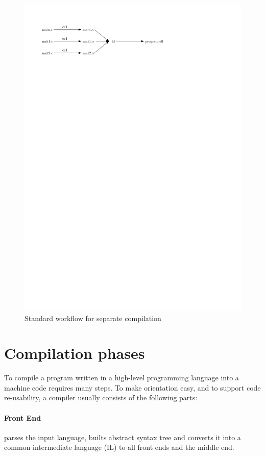 \begin{figure}[h!]
\centering
\includegraphics{./img/non-lto-workflow.pdf}
\caption{Standard workflow for separate compilation}
\label{figure-non-lto-workflow}
\end{figure}


\section{Compilation phases}

To compile a program written in a high-level programming language into a machine
code requires many steps. To make orientation easy, and to support code
re-usability, a compiler usually consists of the following parts:

\paragraph{Front End} parses the input language, builts abstract syntax
tree and converts it into a common intermediate language (IL) to all front ends
and the middle end.

